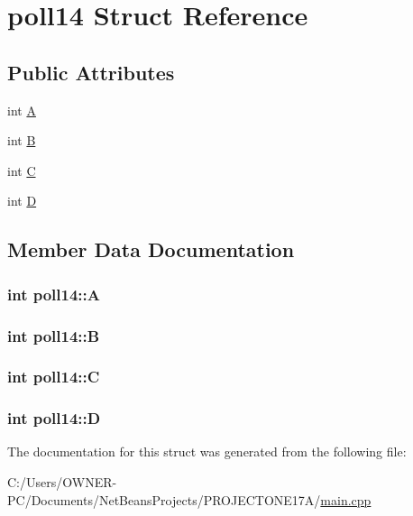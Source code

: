 \hypertarget{structpoll14}{\section{poll14 Struct Reference}
\label{structpoll14}
}
\subsection*{Public Attributes}
\begin{DoxyCompactItemize}
\item 
int \hyperlink{structpoll14_a7564d89cbdedb9eb2601b720a2c98fe2}{A}
\item 
int \hyperlink{structpoll14_a29d5199de17a424937319b6ba24b0ff3}{B}
\item 
int \hyperlink{structpoll14_ac39c6dc4bb4da02be325626a6017cf8c}{C}
\item 
int \hyperlink{structpoll14_aff4e9a1b8d8c03f0199618e527ab4495}{D}
\end{DoxyCompactItemize}


\subsection{Member Data Documentation}
\hypertarget{structpoll14_a7564d89cbdedb9eb2601b720a2c98fe2}{
\subsubsection[{A}]{\setlength{\rightskip}{0pt plus 5cm}int poll14\+::\+A}}\label{structpoll14_a7564d89cbdedb9eb2601b720a2c98fe2}
\hypertarget{structpoll14_a29d5199de17a424937319b6ba24b0ff3}{
\subsubsection[{B}]{\setlength{\rightskip}{0pt plus 5cm}int poll14\+::\+B}}\label{structpoll14_a29d5199de17a424937319b6ba24b0ff3}
\hypertarget{structpoll14_ac39c6dc4bb4da02be325626a6017cf8c}{
\subsubsection[{C}]{\setlength{\rightskip}{0pt plus 5cm}int poll14\+::\+C}}\label{structpoll14_ac39c6dc4bb4da02be325626a6017cf8c}
\hypertarget{structpoll14_aff4e9a1b8d8c03f0199618e527ab4495}{
\subsubsection[{D}]{\setlength{\rightskip}{0pt plus 5cm}int poll14\+::\+D}}\label{structpoll14_aff4e9a1b8d8c03f0199618e527ab4495}


The documentation for this struct was generated from the following file\+:\begin{DoxyCompactItemize}
\item 
C\+:/\+Users/\+O\+W\+N\+E\+R-\/\+P\+C/\+Documents/\+Net\+Beans\+Projects/\+P\+R\+O\+J\+E\+C\+T\+O\+N\+E17\+A/\hyperlink{main_8cpp}{main.\+cpp}\end{DoxyCompactItemize}
